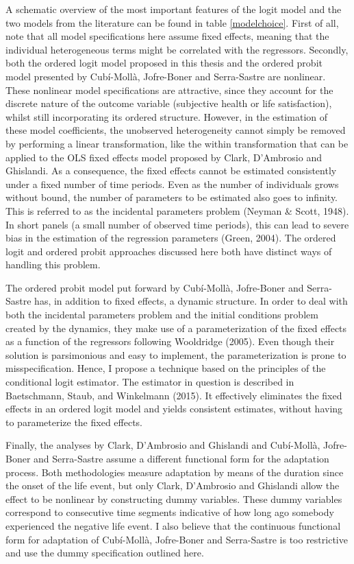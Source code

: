\documentclass[12pt]{article}
\begin{document}
A schematic overview of the most important features of the logit model and the two models from the literature can be found in table \ref{modelchoice}. First of all, note that all model specifications here assume fixed effects, meaning that the individual heterogeneous terms might be correlated with the regressors. Secondly, both the ordered logit model proposed in this thesis and the ordered probit model presented by Cub\'i-Moll\`a, Jofre-Boner and Serra-Sastre are nonlinear. These nonlinear model specifications are attractive, since they account for the discrete nature of the outcome variable (subjective health or life satisfaction), whilst still incorporating its ordered structure. However, in the estimation of these model coefficients, the unobserved heterogeneity cannot simply be removed by performing a linear transformation, like the within transformation that can be applied to the OLS fixed effects model proposed by Clark, D'Ambrosio and Ghislandi. As a consequence, the fixed effects cannot be estimated consistently under a fixed number of time periods. Even as the number of individuals grows without bound, the number of parameters to be estimated also goes to infinity. This is referred to as the incidental parameters problem (Neyman \& Scott, 1948). In short panels (a small number of observed time periods), this can lead to severe bias in the estimation of the regression parameters (Green, 2004). The ordered logit and ordered probit approaches discussed here both have distinct ways of handling this problem.

The ordered probit model put forward by Cub\'i-Moll\`a, Jofre-Boner and Serra-Sastre has, in addition to fixed effects, a dynamic structure. In order to deal with both the incidental parameters problem and the initial conditions problem created by the dynamics, they make use of a parameterization of the fixed effects as a function of the regressors following Wooldridge (2005). Even though their solution is parsimonious and easy to implement, the parameterization is prone to misspecification. Hence, I propose a technique based on the principles of the conditional logit estimator. The estimator in question is described in Baetschmann, Staub, and Winkelmann (2015). It effectively eliminates the fixed effects in an ordered logit model and yields consistent estimates, without having to parameterize the fixed effects.  

Finally, the analyses by Clark, D'Ambrosio and Ghislandi and Cub\'i-Moll\`a, Jofre-Boner and Serra-Sastre assume a different functional form for the adaptation process. Both methodologies measure adaptation by means of the duration since the onset of the life event, but only Clark, D'Ambrosio and Ghislandi allow the effect to be nonlinear by constructing dummy variables. These dummy variables correspond to consecutive time segments indicative of how long ago somebody experienced the negative life event. I also believe that the continuous functional form for adaptation of Cub\'i-Moll\`a, Jofre-Boner and Serra-Sastre is too restrictive and use the dummy specification outlined here. 
\end{document}
